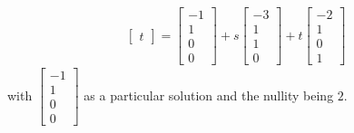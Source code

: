 \begin{solution}
\begin{align*}
\begin{bmatrix}
t
\end{bmatrix}
=
\begin{bmatrix}
-1 \\
1 \\
0 \\
0
\end{bmatrix}
+ s
\begin{bmatrix}
-3 \\
1 \\
1 \\
0
\end{bmatrix}
+
t
\begin{bmatrix}
-2 \\
1 \\
0 \\
1
\end{bmatrix}
\end{align*}
with 
$\begin{bmatrix}
-1 \\
1 \\
0 \\
0
\end{bmatrix}$ as a particular solution and the nullity being $2$.
\end{solution}

